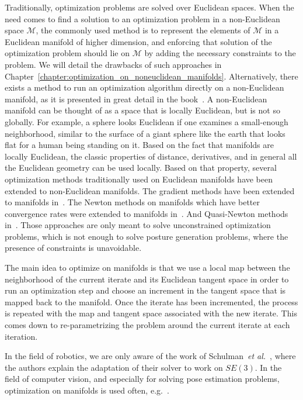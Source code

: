 Traditionally, optimization problems are solved over Euclidean spaces.
When the need comes to find a solution to an optimization problem in a non-Euclidean space $\mathcal{M}$, the commonly used method is to represent the elements of $\mathcal{M}$ in a Euclidean manifold of higher dimension, and enforcing that solution of the optimization problem should lie on $\mathcal{M}$ by adding the necessary constraints to the problem.
We will detail the drawbacks of such approaches in Chapter~\ref{chapter:optimization_on_noneuclidean_manifolds}.
Alternatively, there exists a method to run an optimization algorithm directly on a non-Euclidean manifold, as it is presented in great detail in the book~\cite{absil:book:2008}.
A non-Euclidean manifold can be thought of as a space that is locally Euclidean, but is not so globally.
For example, a sphere looks Euclidean if one examines a small-enough neighborhood, similar to the surface of a giant sphere like the earth that looks flat for a human being standing on it.
Based on the fact that manifolds are locally Euclidean, the classic properties of distance, derivatives, and in general all the Euclidean geometry can be used locally.
Based on that property, several optimization methods traditionally used on Euclidean manifolds have been extended to non-Euclidean manifolds.
The gradient methods have been extended to manifolds in~\cite{luenberger1972gradient, gabay1982minimizing}.
The Newton methods on manifolds which have better convergence rates were extended to manifolds in~\cite{gabay1982minimizing, stuart1998dynamical, smith2013geometric}.
And Quasi-Newton methods in~\cite{gabay1982minimizing}.
Those approaches are only meant to solve unconstrained optimization problems, which is not enough to solve posture generation problems, where the presence of constraints is unavoidable.

The main idea to optimize on manifolds is that we use a local map between the neighborhood of the current iterate and its Euclidean tangent space in order to run an optimization step and choose an increment in the tangent space that is mapped back to the manifold.
Once the iterate has been incremented, the process is repeated with the map and tangent space associated with the new iterate.
This comes down to re-parametrizing the problem around the current iterate at each iteration.

In the field of robotics, we are only aware of the work of Schulman~\emph{et al.}~\cite{Schulman2014}, where the authors explain the adaptation of their solver to work on $SE(3)$.
In the field of computer vision, and especially for solving pose estimation problems, optimization on manifolds is used often, e.g.~\cite{hertzberg2011, lu2000fast}.

